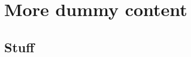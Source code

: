 \chapter{More dummy content}

\thispagestyle{chapter}

\blindtext

\blinditemize

\section{Stuff}

\blindmathtrue
\Blindtext